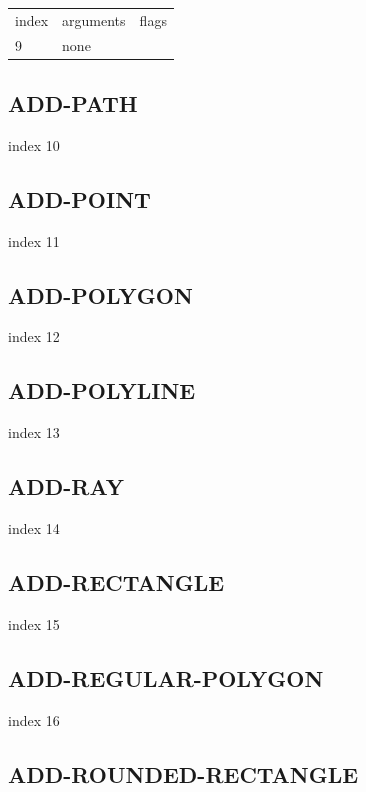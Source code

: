 \documentclass[a4paper]{report}
\begin{document}
{{{{{{{{{{{{{\begin{center}
\begin{tabular}{l | l | l}
index & arguments & flags \\
9 & none & 
\end{tabular}
\end{center}

\subsection{ADD-PATH}

index 10

\subsection{ADD-POINT}

index 11

\subsection{ADD-POLYGON}

index 12

\subsection{ADD-POLYLINE}

index 13

\subsection{ADD-RAY}

index 14

\subsection{ADD-RECTANGLE}

index 15

\subsection{ADD-REGULAR-POLYGON}

index 16

\subsection{ADD-ROUNDED-RECTANGLE}

}}}}}}}}}}}}}
\end{document}
